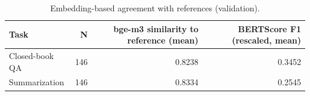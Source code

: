 \begin{table}[t]
\centering
\caption{Embedding-based agreement with references (validation).}
\label{tab:t8_semantic_agreement}
\begin{tabular}{lrrr}
\toprule
Task & N & bge-m3 similarity to reference (mean) & BERTScore F1 (rescaled, mean) \\
\midrule
Closed-book QA & 146 & 0.8238 & 0.3452 \\
Summarization & 146 & 0.8334 & 0.2545 \\
\bottomrule
\end{tabular}
\end{table}
